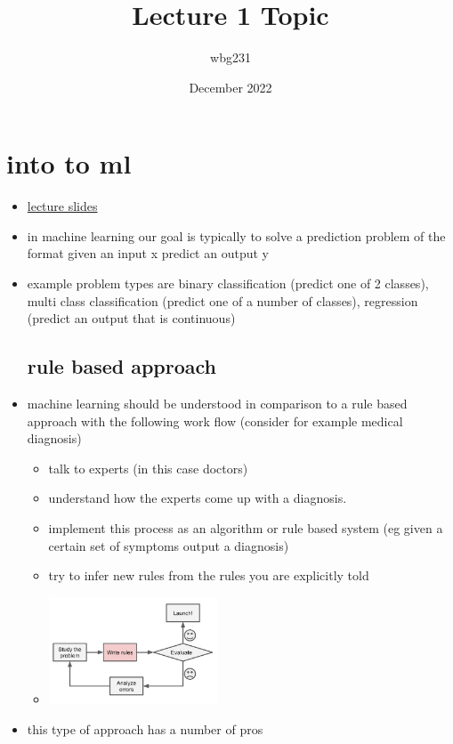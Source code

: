 \documentclass{article}
\title{Lecture 1 Topic}
\author{wbg231 }
\date{December 2022}
\begin{document}
\maketitle

\section{into to ml}
\begin{itemize}
\item \href{https://nyu-ds1003.github.io/mlcourse/2023/lectures/lec01/01b.intro-machine-learning.pdf}{lecture slides}
\item in machine learning our goal is typically to solve a prediction problem of the format given an input x predict an output y 
\item example problem types are binary classification (predict one of 2 classes), multi class classification (predict one of a number of classes), regression (predict an output that is continuous) 
\subsection{rule based approach}
\item machine learning should be understood in comparison to a rule based approach with the following work flow (consider for example medical diagnosis)
\begin{itemize}
    \item talk to experts (in this case doctors)
    \item understand how the experts come up with a diagnosis.
    \item implement this process as an algorithm or rule based system (eg given a certain set of symptoms output a diagnosis)
    \item try to infer new rules from the rules you are explicitly told 
    \item \includegraphics[width=5cm]{lecture_notes/lecture_1/wba.jpg}
\end{itemize}
\item this type of approach has a number of pros 


\end{itemize}
\end{document}
